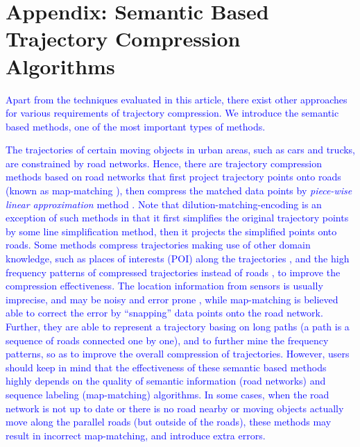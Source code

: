 \section*{{Appendix: Semantic Based Trajectory Compression Algorithms}}
\textcolor{blue}{Apart from the techniques evaluated in this article, there exist other approaches for various requirements of trajectory compression. We introduce the semantic based methods, one of the most important types of methods.}

\textcolor{blue}{The trajectories of certain moving objects in urban areas, such as cars and trucks, are constrained by road networks. Hence, there are trajectory compression methods based on road networks \cite{Chen:Trajectory, Popa:Spatio,Civilis:Techniques,Hung:Clustering, Kellaris:Map, Song:PRESS, Han:Compress, Cao:Road} that first project trajectory points onto roads (known as map-matching \cite{Quddus:MapMatching}), then compress the matched data points by \emph{piece-wise linear approximation} method \cite{Elmeleegy:Stream, Xie:Stream,Luo:Streaming,ORourke:Fitting}. Note that dilution-matching-encoding \cite{Gotsman:Compaction} is an exception of such methods in that it first simplifies the original trajectory points by some line simplification method, then it projects the simplified points onto roads.}
%
\textcolor{blue}{Some methods \cite{Schmid:Semantic, Richter:Semantic} compress trajectories making use of other domain knowledge, such as places of interests (POI) along the trajectories \cite{Richter:Semantic}, and the high frequency patterns of compressed trajectories instead of roads \cite{Gotsman:Compaction, Song:PRESS, Han:Compress,Koide:CiNCT}, to improve the compression effectiveness.}
%
\textcolor{blue}{The location information from sensors is usually imprecise, and may be noisy and error prone \cite{Cao:Road}, while map-matching is believed able to correct the error by ``snapping'' data points onto the road network. Further, they are able to represent a trajectory basing on long paths (a path is a sequence of roads connected one by one), and to further mine the frequency patterns, so as to improve the overall compression of trajectories.}
%
\textcolor{blue}{However, users should keep in mind that the effectiveness of these semantic based methods highly depends on the quality of semantic information (\eg road networks) and sequence labeling (\eg map-matching) algorithms. In some cases, \eg when the road network is not up to date or there is no road nearby or moving objects actually move along the parallel roads (but outside of the roads), these methods may result in incorrect map-matching, and introduce extra errors.}

